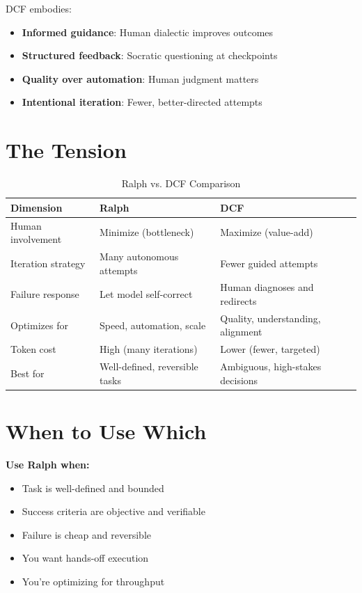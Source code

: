DCF embodies:
\begin{itemize}
    \item \textbf{Informed guidance}: Human dialectic improves outcomes
    \item \textbf{Structured feedback}: Socratic questioning at checkpoints
    \item \textbf{Quality over automation}: Human judgment matters
    \item \textbf{Intentional iteration}: Fewer, better-directed attempts
\end{itemize}

\section{The Tension}

\begin{table}[H]
\centering
\begin{tabular}{lll}
\toprule
\textbf{Dimension} & \textbf{Ralph} & \textbf{DCF} \\
\midrule
Human involvement & Minimize (bottleneck) & Maximize (value-add) \\
Iteration strategy & Many autonomous attempts & Fewer guided attempts \\
Failure response & Let model self-correct & Human diagnoses and redirects \\
Optimizes for & Speed, automation, scale & Quality, understanding, alignment \\
Token cost & High (many iterations) & Lower (fewer, targeted) \\
Best for & Well-defined, reversible tasks & Ambiguous, high-stakes decisions \\
\bottomrule
\end{tabular}
\caption{Ralph vs. DCF Comparison}
\end{table}

\section{When to Use Which}

\textbf{Use Ralph when:}
\begin{itemize}
    \item Task is well-defined and bounded
    \item Success criteria are objective and verifiable
    \item Failure is cheap and reversible
    \item You want hands-off execution
    \item You're optimizing for throughput
\end{itemize}

